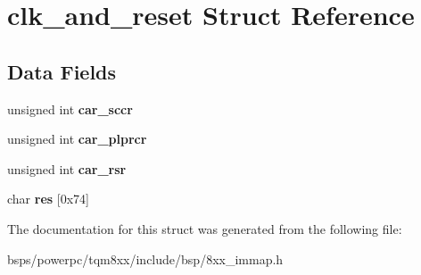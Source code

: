 \hypertarget{structclk__and__reset}{}\section{clk\+\_\+and\+\_\+reset Struct Reference}
\label{structclk__and__reset}
\subsection*{Data Fields}
\begin{DoxyCompactItemize}
\item 
\mbox{\label{structclk__and__reset_a1f11d48b480a14f2eae9853a0be87eea}} 
unsigned int {\bfseries car\+\_\+sccr}
\item 
\mbox{\label{structclk__and__reset_a4c6d72bc7631a43fda95e4ce68db4fef}} 
unsigned int {\bfseries car\+\_\+plprcr}
\item 
\mbox{\label{structclk__and__reset_a73bc468a36ccdb440caf345672e6852d}} 
unsigned int {\bfseries car\+\_\+rsr}
\item 
\mbox{\label{structclk__and__reset_a91b5a29d4a168659aec49d893259a003}} 
char {\bfseries res} \mbox{[}0x74\mbox{]}
\end{DoxyCompactItemize}


The documentation for this struct was generated from the following file\+:\begin{DoxyCompactItemize}
\item 
bsps/powerpc/tqm8xx/include/bsp/8xx\+\_\+immap.\+h\end{DoxyCompactItemize}

